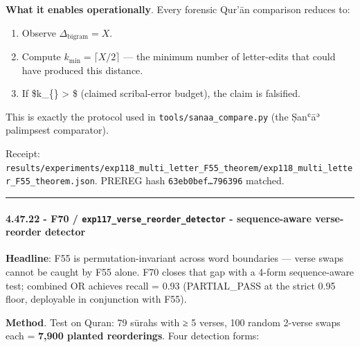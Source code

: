 \documentclass[
]{article}
\providecommand{\tightlist}{%
  \setlength{\itemsep}{0pt}\setlength{\parskip}{0pt}}
\begin{document}
\textbf{What it enables operationally}. Every forensic Qur'ān comparison
reduces to:

\begin{enumerate}
\def\labelenumi{\arabic{enumi}.}
\tightlist
\item
  Observe \(\Delta_{\text{bigram}} = X\).
\item
  Compute \(k_{\min} = \lceil X / 2 \rceil\) --- the minimum number of
  letter-edits that could have produced this distance.
\item
  If \$k\_\{\min\} \textgreater{} \$ (claimed scribal-error budget), the
  claim is falsified.
\end{enumerate}

This is exactly the protocol used in \texttt{tools/sanaa\_compare.py}
(the Ṣanʿāʾ palimpsest comparator).

Receipt:
\texttt{results/experiments/exp118\_multi\_letter\_F55\_theorem/exp118\_multi\_letter\_F55\_theorem.json}.
PREREG hash \texttt{63eb0bef…796396} matched.

\begin{center}\rule{0.5\linewidth}{0.5pt}\end{center}

\paragraph{\texorpdfstring{4.47.22 - F70 /
\texttt{exp117\_verse\_reorder\_detector} - sequence-aware verse-reorder
detector}{4.47.22 - F70 / exp117\_verse\_reorder\_detector - sequence-aware verse-reorder detector}}\label{f70-exp117_verse_reorder_detector---sequence-aware-verse-reorder-detector}

\textbf{Headline}: F55 is permutation-invariant across word boundaries
--- verse swaps cannot be caught by F55 alone. F70 closes that gap with
a 4-form sequence-aware test; combined OR achieves recall = 0.93
(PARTIAL\_PASS at the strict 0.95 floor, deployable in conjunction with
F55).

\textbf{Method}. Test on Quran: 79 sūrahs with ≥ 5 verses, 100 random
2-verse swaps each = \textbf{7,900 planted reorderings}. Four detection
forms:
\end{document}
